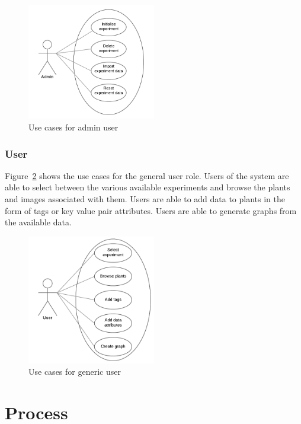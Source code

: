 \begin{figure}[H]
    \centering
    \includegraphics[width=0.5\textwidth]{images/analysis/admin_case}
    \caption{Use cases for admin user}
    \label{fig:admin_case}
\end{figure}

\subsubsection{User}

Figure~\ref{fig:user_case} shows the use cases for the general user role. Users of the system are able to select between the various available experiments and browse the plants and images associated with them. Users are able to add data to plants in the form of tags or key value pair attributes. Users are able to generate graphs from the available data.

\begin{figure}[H]
    \centering
    \includegraphics[width=0.5\textwidth]{images/analysis/user_case}
    \caption{Use cases for generic user}
    \label{fig:user_case}
\end{figure}

\section{Process}\label{proc}

